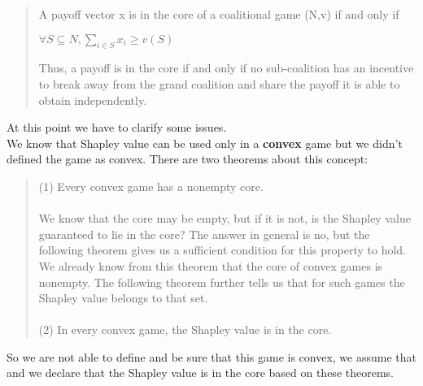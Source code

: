 \documentclass{article}
\begin{document}
{\begin{quote}
    A payoff vector x is in the core of a coalitional game (N,v) if and only if
    \begin{center}
        $\forall S \subseteq N, \displaystyle \sum_{i \in S} x_i \ge v(S)$
    \end{center}
    Thus, a payoff is in the core if and only if no sub-coalition has an incentive to break away from the grand coalition and share the payoff it is able to obtain independently.\\
\end{quote}
At this point we have to clarify some issues.\\
We know that Shapley value can be used only in a \textbf{convex} game but we didn't defined the game as convex. There are two theorems about this concept:
\begin{quote}
    (1) Every convex game has a nonempty core.\\\\
    We know that the core may be empty, but if it is not, is the Shapley value guaranteed to lie in the core? The answer in general is no, but the following theorem gives us a sufficient condition for this property to hold. We already know from this theorem that the core of convex games is nonempty. The following theorem further tells us that for such games the Shapley value belongs to that set.\\\\
    (2) In every convex game, the Shapley value is in the core.
\end{quote}
So we are not able to define and be sure that this game is convex, we assume that and we declare that the Shapley value is in the core based on these theorems.
}
\end{document}
